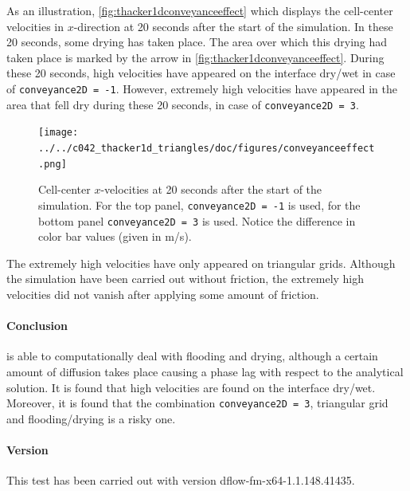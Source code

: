 As an illustration, \autoref{fig:thacker1dconveyanceeffect} which displays the cell-center velocities in $x$-direction at 20 seconds after the start of the simulation. In these 20 seconds, some drying has taken place. The area over which this drying had taken place is marked by the arrow in \autoref{fig:thacker1dconveyanceeffect}. During these 20 seconds, high velocities have appeared on the interface dry/wet in case of \texttt{conveyance2D = -1}. However, extremely high velocities have appeared in the area that fell dry during these 20 seconds, in case of \texttt{conveyance2D = 3}. 

\begin{figure}[h!]
\begin{center}
\texttt{[image: ../../c042\_thacker1d\_triangles/doc/figures/conveyanceeffect.png]}
\end{center}\caption{Cell-center $x$-velocities at 20 seconds after the start of the simulation. For the top panel, \texttt{conveyance2D = -1} is used, for the bottom panel \texttt{conveyance2D = 3} is used. Notice the difference in color bar values (given in m/s). \label{fig:thacker1dconveyanceeffect}}
\end{figure}

The extremely high velocities have only appeared on triangular grids. Although the simulation have been carried out without friction, the extremely high velocities did not vanish after applying some amount of friction.



\paragraph*{Conclusion}
\dflowfm is able to computationally deal with flooding and drying, although a certain amount of diffusion takes place causing a phase lag with respect to the analytical solution. It is found that high velocities are found on the interface dry/wet. Moreover, it is found that the combination \texttt{conveyance2D = 3}, triangular grid and flooding/drying is a risky one.


\paragraph*{Version}
This test has been carried out with version dflow-fm-x64-1.1.148.41435.


